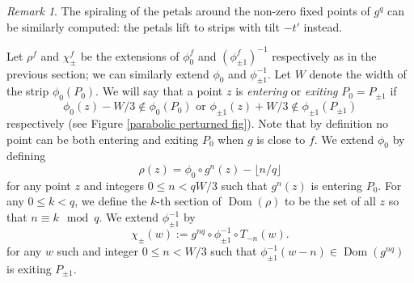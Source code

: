 \documentclass[12pt,letterpaper]{amsart}
\numberwithin{equation}{section}
\newtheorem{prop}[equation]{Proposition}
\theoremstyle{remark}
\newtheorem{remark}[equation]{Remark}
\theoremstyle{definition}
\newcommand{\R}{\mathbb R}
\DeclareMathOperator{\Dom}{Dom}
\begin{document}
	
%	
	
	\begin{remark}
		The spiraling of the petals around the non-zero fixed points of $g^q$ can be similarly computed: the petals lift to strips with tilt $-t'$ instead.
	\end{remark}
	
	
	Let $\rho^f$ and $\chi_\pm^f$ be the extensions of $\phi_0^f$ and $(\phi_{\pm 1}^f)^{-1}$ respectively as in the previous section; we can similarly extend $\phi_0$ and $\phi_{\pm 1}^{-1}$.
	Let $W$ denote the width of the strip $\phi_0(P_0)$.
	We will say that a point $z$ is \textit{entering} or \textit{exiting} $P_0=P_{\pm 1}$ if 
	$$\phi_0(z)-W/3\notin \phi_0(P_0) \text{ or }\phi_{\pm 1}(z)+ W/3\notin \phi_{\pm 1}(P_{\pm 1})$$
	respectively (see Figure \ref{parabolic perturned fig}). 	Note that by definition no point can be both entering and exiting $P_0$ when $g$ is close to $f$.
	We extend $\phi_0$ by defining
	$$\rho(z) = \phi_0\circ g^{n}(z)-\lfloor n/q\rfloor$$
	for any point $z$ and integers  $0 \leq n < qW/3$ such that $g^{n}(z)$ is entering $P_0$.
	For any $0\leq k < q$, we define the $k$-th section of $\Dom(\rho)$ to be the set of all $z$ so that $n \equiv k \mod q$.	
	We extend $\phi_{\pm 1}^{-1}$ by 
	$$\chi_\pm(w):= g^{nq}\circ \phi_{\pm 1}^{-1}\circ T_{-n}(w).$$
	for any $w$ such and integer $0\leq n< W/3$ such that $\phi_{\pm 1}^{-1}(w-n)\in \Dom(g^{nq})$ is exiting $P_{\pm 1}$.
	
\end{document}
